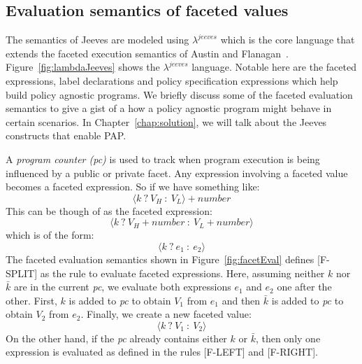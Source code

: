 \subsection{Evaluation semantics of faceted values \label{sec:facetEval}}
The semantics of Jeeves are modeled using $\lambda^{jeeves}$ which is the core
language that extends the faceted execution semantics of Austin and Flanagan~\cite{Faceted}.
Figure~\ref{fig:lambdaJeeves} shows the $\lambda^{jeeves}$ language. Notable here
are the faceted expressions, label declarations and policy specification expressions
which help build policy agnostic programs. We briefly discuss some of the faceted
evaluation semantics to give a gist of a how a policy agnostic program might behave
in certain scenarios. In Chapter~\ref{chap:solution}, we will talk about the Jeeves
constructs that enable PAP.

A \textit{program counter (pc)} is used to track when program execution is being
influenced by a public or private facet. Any expression involving a faceted value
becomes a faceted expression. So if we have something like:
\[\langle k~?~V_H~:~V_L \rangle + number \]
This can be though of as the faceted expression:
\[\langle k~?~V_H + number~:~V_L + number \rangle\]
which is of the form:
\[\langle k~?~e_1~:~e_2 \rangle\]
The faceted evaluation semantics shown in Figure~\ref{fig:facetEval} defines [F-SPLIT]
as the rule to evaluate faceted expressions. Here, assuming neither $k$ nor $\bar{k}$
are in the current \textit{pc}, we evaluate both expressions $e_1$ and $e_2$
one after the other. First, $k$ is added to \textit{pc} to obtain $V_1$ from $e_1$
and then $\bar{k}$ is added to \textit{pc} to obtain $V_2$ from $e_2$. Finally,
we create a new faceted value:
\[\langle k~?~V_1~:~V_2 \rangle\]
On the other hand, if the \textit{pc} already contains either $k$ or $\bar{k}$,
then only one expression is evaluated as defined in the rules [F-LEFT] and [F-RIGHT].

